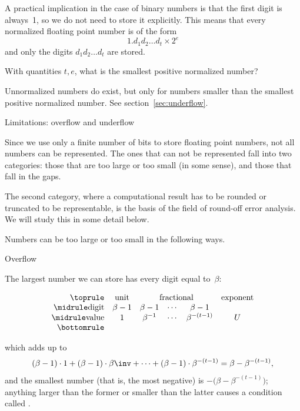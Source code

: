 A practical implication in the case of binary numbers is that the
first digit is always~1, so we do not need to store it explicitly.
This means that every normalized floating point number
is of the form
\begin{equation}
  1.d_1d_2\ldots d_t\times 2^e
\end{equation}
and only the digits $d_1d_2\ldots d_t$ are stored.

\begin{exercise}
  With quantities $t,e$, what is the smallest positive normalized number?
\end{exercise}

Unnormalized numbers do exist, but only for numbers smaller
than the smallest positive normalized number.
See section~\ref{sec:underflow}.


 {Limitations: overflow and underflow}
\label{sec:exceptions}

Since we use only a finite number of bits to store floating point
numbers, not all numbers can be represented. The ones that can not be
represented fall into two categories: those that are too large or too
small (in some sense), and those that fall in the gaps.

The second category, where a computational result has to be rounded or
truncated to be representable, is the basis of the field of round-off
error analysis.
We will study this in some detail
below.

Numbers can be
too large or too small in the following ways.

 {Overflow}

The largest number we can store has every digit equal to~$\beta$:

\begin{equation}
\begin{array}{rccccc}
  \toprule
  &\textrm{unit}&\multicolumn{3}{c}{\textrm{fractional}}&\textrm{exponent}\\
  \midrule
  \textrm{digit}&\beta-1&\beta-1&\cdots&\beta-1&\\
  \midrule
  \textrm{value}&1&\beta^{-1}&\cdots&\beta^{-(t-1)}&U \\
  \bottomrule
\end{array}
\end{equation}

which adds up to
\begin{equation}
  (\beta-1)\cdot1+(\beta-1)\cdot\beta\inv+\cdots
+(\beta-1)\cdot\beta^{-(t-1)}=\beta-\beta^{-(t-1)},
\end{equation}
and the smallest number
(that is, the most negative)
is
$-\bigl(\beta-\beta^{-(t-1)}\bigr)$;
anything larger than the
former or smaller than the latter causes a condition called
.


